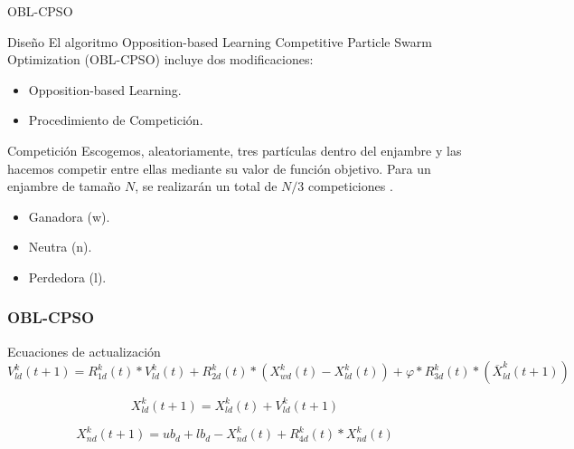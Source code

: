 \begin{frame}{OBL-CPSO}
\begin{block}{Diseño}
El algoritmo Opposition-based Learning Competitive Particle Swarm Optimization (OBL-CPSO) \cite{oblcpso} incluye dos modificaciones:
\begin{itemize}
	\item Opposition-based Learning.
	\item Procedimiento de Competición.
\end{itemize}
\end{block}

\begin{block}{Competición}
Escogemos, aleatoriamente, tres partículas dentro del enjambre y las hacemos competir entre ellas mediante su valor de función objetivo. 
Para un enjambre de tamaño $N$, se realizarán un total de $N/3$ competiciones \cite{oblcpso}.
\begin{itemize}
  \Fontvi
  \item Ganadora (w).
  \item Neutra (n).
  \item Perdedora (l).
\end{itemize}
\end{block}
\end{frame}


\begin{frame}[shrink=20]
\frametitle{OBL-CPSO}
\begin{block}{Ecuaciones de actualización}
\centering
\begin{equation}\label{eq:7}
    V^{k}_{ld}(t+1) = R^{k}_{1d}(t) * V^{k}_{ld}(t) + R^{k}_{2d}(t) * (X^{k}_{wd}(t) - X^{k}_{ld}(t)) + \varphi * R^{k}_{3d}(t) * (\overline{X}^{k}_{ld}(t+1)) 
\end{equation}

\begin{equation}\label{eq:8}
     X^{k}_{ld}(t+1) = X^{k}_{ld}(t) + V^{k}_{ld}(t+1)
\end{equation}

\begin{equation}\label{eq:9}
     X^{k}_{nd}(t+1) = ub_{d} + lb_{d} - X^{k}_{nd}(t) + R^{k}_{4d}(t) * X^{k}_{nd}(t)
\end{equation}

\end{block}
\end{frame}

